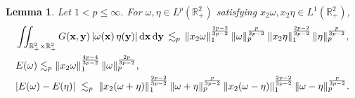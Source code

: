\documentclass[11pt]{amsart}
\newtheorem{lemma}[theorem]{Lemma}
\theoremstyle{definition}
\theoremstyle{definition}
\numberwithin{equation}{section}
\newcommand{\0}{\emptyset}
\newcommand{\bfx}{{\bf x}}
\newcommand{\bfy}{{\bf y}}
\newcommand{\bbR}{\mathbb R}
\newcommand{\dd}{\mathrm{d}}
\begin{document}
	\begin{lemma}\label{lem_energy}
		Let $1<p \leq \infty$. For $\omega,\eta \in L^p(\bbR^2_+)$ satisfying $x_2\omega, x_2\eta \in L^1(\bbR^2_+)$, 
		\begin{align}
			&\iint_{\bbR^2_+ \times \bbR^2_+} G(\bfx,\bfy)\,|\omega(\bfx)\,\eta(\bfy)|\,\dd\bfx\,\dd\bfy
			\, 
			\lesssim_p \, 
			\|x_2\omega\|_{1}^{\frac{2p-2}{3p-2}}\,
			\|\omega\|_{p}^{\frac{p}{3p-2}}\,
			\|x_2\eta\|_{1}^{\frac{2p-2}{3p-2}}\,
			\|\eta\|_{p}^{\frac{p}{3p-2}},   \label{eq_0704_01}\\
			&E(\omega) 
			\lesssim_p 
			\|x_2\omega\|_{1}^{\frac{4p-4}{3p-2}}\,
			\|\omega\|_{p}^{\frac{2p}{3p-2}},		\label{eq_0704_02}  \\
			&|E(\omega)-E(\eta)| \;
			\lesssim_p\;
			\|x_2(\omega+\eta)\|_{1}^{\frac{2p-2}{3p-2}}\,
			\|\omega+\eta\|_{p}^{\frac{p}{3p-2}}\,
			\|x_2(\omega-\eta)\|_{1}^{\frac{2p-2}{3p-2}}\,
			\|\omega-\eta\|_{p}^{\frac{p}{3p-2}}.  \label{eq_0704_03}
		\end{align}
	\end{lemma}
	
\end{document}
